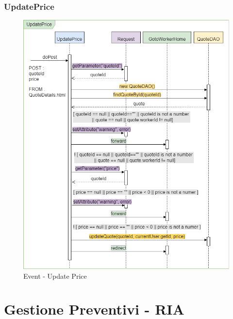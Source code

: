 \documentclass[a4paper, 12pt]{article}
\begin{document}
\subsubsection{UpdatePrice}
\begin{figure}[h!]
	\centering
	\includegraphics[width=1\textwidth]{PureHTML_images/UpdatePrice.png}
	\caption{Event - Update Price}
	\label{figure:updateprice_sd}
\end{figure}

\newpage
\section{Gestione Preventivi - RIA}
\end{document}
